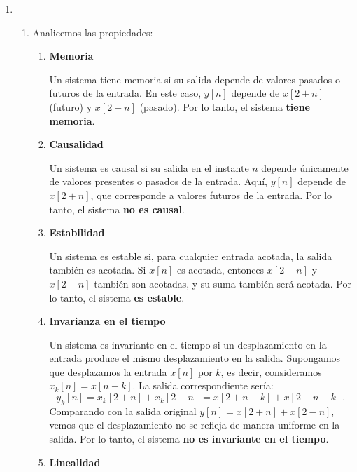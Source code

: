 \begin{enumerate}[label=\color{red}\textbf{\arabic*)}]
\begin{enumerate}[label=\color{red}\textbf{\alph*)}]
\begin{itemize}[label=\textbullet]
\begin{center}
                \end{center}
        \end{itemize}
\end{enumerate}
\item {}
    \begin{enumerate}[label=\color{red}\textbf{\alph*)}]
        \item {}

            Analicemos las propiedades:
            \begin{enumerate}[label=\textbf{\arabic*)}]
                \item \textbf{Memoria}

                    Un sistema tiene memoria si su salida depende de valores pasados o futuros de la entrada. En este caso, $y[n]$ depende de  $x[2+n]$ (futuro) y $x[2-n]$ (pasado). Por lo tanto, el sistema  \textbf{tiene memoria}.
                \item \textbf{Causalidad}

                    Un sistema es causal si su salida en el instante $n$ depende únicamente de valores presentes o pasados de la entrada. Aquí, $y[n]$ depende de  $x[2+n]$, que corresponde a valores futuros de la entrada. Por lo tanto, el sistema  \textbf{no es causal}.
                \item \textbf{Estabilidad}

                    Un sistema es estable si, para cualquier entrada acotada, la salida también es acotada. Si $x[n]$ es acotada, entonces  $x[2+n]$ y  $x[2-n]$ también son acotadas, y su suma también será acotada. Por lo tanto, el sistema  \textbf{es estable}. 
                \item \textbf{Invarianza en el tiempo}

                    Un sistema es invariante en el tiempo si un desplazamiento en la entrada produce el mismo desplazamiento en la salida. Supongamos que desplazamos la entrada $x[n]$ por  $k$, es decir, consideramos  $x_k[n]=x[n-k]$. La salida correspondiente sería:  \[
                        y_k[n]=x_k[2+n]+x_k[2-n]=x[2+n-k]+x[2-n-k].
                    \] 
                    Comparando con la salida original $y[n]=x[2+n]+x[2-n]$, vemos que el desplazamiento no se refleja de manera uniforme en la salida. Por lo tanto, el sistema  \textbf{no es invariante en el tiempo}. 
                \item \textbf{Linealidad}
                    

\end{enumerate}
\end{enumerate}
\end{enumerate}
